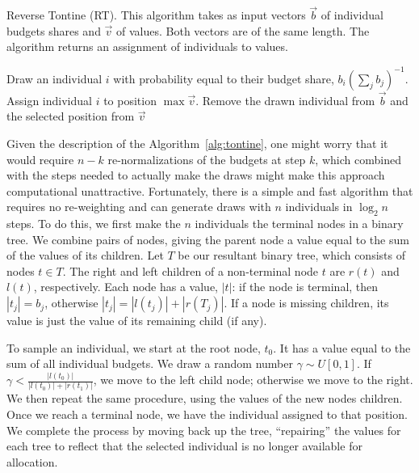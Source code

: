 \begin{algorithm} 
\caption{Reverse Tontine (RT). This algorithm takes as input vectors
  $\vec{b}$ of individual budgets shares and $\vec{v}$ of values. Both
  vectors are of the same length. The algorithm returns an assignment
  of individuals to values.}
\label{alg:tontine}

\begin{algorithmic}
\STATE Draw an individual $i$ with probability equal to their budget share,
$b_i \left(\sum_j b_j\right)^{-1}$. 
\STATE Assign individual $i$ to position $\max \vec
v$. 
\STATE Remove the drawn individual from $\vec b$ and the selected position
from $\vec v$ 
\ENDWHILE
\end{algorithmic}
\end{algorithm} 


Given the description of the Algorithm~\ref{alg:tontine}, one might
worry that it would require $n-k$ re-normalizations of the budgets at
step $k$, which combined with the steps needed to actually make the
draws might make this approach computational
unattractive. Fortunately, there is a simple and fast algorithm that
requires no re-weighting and can generate draws with $n$ individuals
in $\log_2 n$ steps. To do this, we first make the $n$ individuals
the terminal nodes in a binary tree. We combine pairs of nodes, giving
the parent node a value equal to the sum of the values of its
children. Let $T$ be our resultant binary tree, which consists of
nodes $t \in T$. The right and left children of a non-terminal node
$t$ are $r(t)$ and $l(t)$, respectively. Each node has a value, $|t|$:
if the node is terminal, then $|t_j| = b_j$, otherwise $|t_j| =
|l(t_j)| + |r(T_j)|$. If a node is missing children, its value is just
the value of its remaining child (if any).

To sample an individual, we start at the root node, $t_0$. It has a
value equal to the sum of all individual budgets. We draw a random
number $\gamma \sim U[0,1]$. If $\gamma < \frac{|l(t_0)|}{|l(t_0)| +
  |r(t_1)|}$, we move to the left child node; otherwise we move to the
right. We then repeat the same procedure, using the values of the new
nodes children. Once we reach a terminal node, we have the individual
assigned to that position. We complete the process by moving back up
the tree, ``repairing'' the values for each tree to reflect that the
selected individual is no longer available for allocation.

